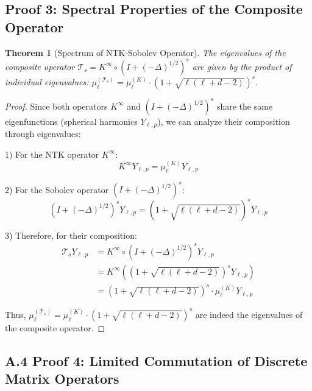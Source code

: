 \documentclass[a4paper]{article}
\theoremstyle{plain}
\newtheorem{theorem}{Theorem}[section]
\theoremstyle{definition}
\theoremstyle{remark}
\begin{document}
\subsection{Proof 3: Spectral Properties of the Composite Operator}
\begin{theorem}[Spectrum of NTK-Sobolev Operator]
The eigenvalues of the composite operator $\mathcal{T}_s = K^{\infty} \circ (I + (-\Delta)^{1/2})^s$ are given by the product of individual eigenvalues: $\mu_\ell^{(\mathcal{T}_s)} = \mu_\ell^{(K)} \cdot (1 + \sqrt{\ell(\ell + d - 2)})^s$.
\end{theorem}

\begin{proof}
Since both operators $K^{\infty}$ and $(I + (-\Delta)^{1/2})^s$ share the same eigenfunctions (spherical harmonics $Y_{\ell,p}$), we can analyze their composition through eigenvalues:

1) For the NTK operator $K^{\infty}$:
   \[ K^{\infty} Y_{\ell,p} = \mu_\ell^{(K)} Y_{\ell,p} \]

2) For the Sobolev operator $(I + (-\Delta)^{1/2})^s$:
   \[ (I + (-\Delta)^{1/2})^s Y_{\ell,p} = (1 + \sqrt{\ell(\ell + d - 2)})^s Y_{\ell,p} \]

3) Therefore, for their composition:
   \begin{align*}
   \mathcal{T}_s Y_{\ell,p} &= K^{\infty} \circ (I + (-\Delta)^{1/2})^s Y_{\ell,p} \\
   &= K^{\infty}((1 + \sqrt{\ell(\ell + d - 2)})^s Y_{\ell,p}) \\
   &= (1 + \sqrt{\ell(\ell + d - 2)})^s \cdot \mu_\ell^{(K)} Y_{\ell,p}
   \end{align*}

Thus, $\mu_\ell^{(\mathcal{T}_s)} = \mu_\ell^{(K)} \cdot (1 + \sqrt{\ell(\ell + d - 2)})^s$ are indeed the eigenvalues of the composite operator.
\end{proof}





\newpage
\subsection{A.4 Proof 4: Limited Commutation of Discrete Matrix Operators}
\label{sec:appendix_commutation}
\end{document}

